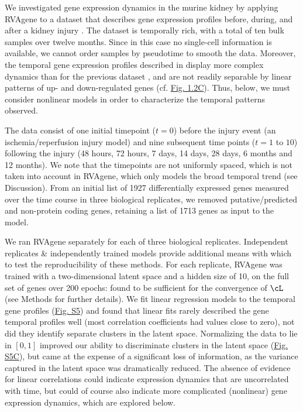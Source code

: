 We investigated gene expression dynamics in the murine kidney by applying RVAgene to a dataset that
describes gene expression profiles before, during, and after a kidney injury
\citep{liu2017molecular}. The dataset is temporally rich, with a total of ten bulk samples over
twelve months. Since in this case no single-cell information is available, we cannot order samples
by pseudotime to smooth the data. Moreover, the temporal gene expression profiles described in
\citet{liu2017molecular} display more complex dynamics than for the previous dataset
\citep{Klein2015}, and are not readily separable by linear patterns of up- and down-regulated genes
(cf. \hyperref[fig:fig3]{Fig. 1.2C}). Thus, below, we must consider nonlinear models in order to characterize the temporal patterns observed.
\par 
The data consist of one initial timepoint ($t = 0$) before the injury event (an ischemia/reperfusion injury model) and nine subsequent time points ($t = 1$ to $10$) following the injury (48 hours, 72 hours, 7 days, 14 days, 28 days, 6 months and 12 months). We note that the timepoints are not uniformly spaced, which is not taken into account in RVAgene, which only models the broad temporal trend (see Discussion). From an initial list of 1927 differentially expressed genes measured over the time course in three biological replicates, we removed putative/predicted and non-protein coding genes, retaining a list of 1713 genes as input to the model.
\par 
We ran RVAgene separately for each of three biological replicates. Independent replicates \& independently trained models provide additional means with which to test the reproducibility of these methods. For each replicate, RVAgene was trained with a two-dimensional latent space and a hidden size of 10, on the full set of genes over 200 epochs: found to be sufficient for the convergence of $\cL$ (see Methods for further details). We fit linear regression models to the temporal gene profiles (\hyperref[supp]{Fig. S5}) and found that linear fits rarely described the gene temporal profiles well (most correlation coefficients had values close to zero), not did they identify separate clusters in the latent space. Normalizing the data to lie in $[0,1]$ improved our ability to discriminate clusters in the latent space (\hyperref[supp]{Fig. S5C}), but came at the expense of a significant loss of information, as the variance captured in the latent space was dramatically reduced. The absence of evidence for linear correlations could indicate expression dynamics that are uncorrelated with time, but could of course also indicate more complicated (nonlinear) gene expression dynamics, which are explored below. 
